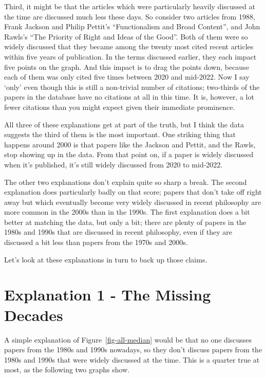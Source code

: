 \documentclass[
  10pt,
  letterpaper,
  DIV=11,
  numbers=noendperiod,
  twoside]{scrartcl}
\begin{document}
Third, it might be that the articles which were particularly heavily
discussed at the time are discussed much less these days. So consider
two articles from 1988, Frank Jackson and Philip Pettit's
``Functionalism and Broad Content'', and John Rawls's ``The Priority of
Right and Ideas of the Good''. Both of them were so widely discussed
that they became among the twenty most cited recent articles within five
years of publication. In the terms discussed earlier, they each impact
five points on the graph. And this impact is to drag the points down,
because each of them was only cited five times between 2020 and
mid-2022. Now I say `only' even though this is still a non-trivial
number of citations; two-thirds of the papers in the database have no
citations at all in this time. It is, however, a lot fewer citations
than you might expect given their immediate prominence.

All three of these explanations get at part of the truth, but I think
the data suggests the third of them is the most important. One striking
thing that happens around 2000 is that papers like the Jackson and
Pettit, and the Rawls, stop showing up in the data. From that point on,
if a paper is widely discussed when it's published, it's still widely
discussed from 2020 to mid-2022.

The other two explanations don't explain quite so sharp a break. The
second explanation does particularly badly on that score; papers that
don't take off right away but which eventually become very widely
discussed in recent philosophy are more common in the 2000s than in the
1990s. The first explanation does a bit better at matching the data, but
only a bit; there are plenty of papers in the 1980s and 1990s that are
discussed in recent philosophy, even if they are discussed a bit less
than papers from the 1970s and 2000s.

Let's look at these explanations in turn to back up those claims.

\section{Explanation 1 - The Missing Decades}\label{sec-missing-decades}

A simple explanation of Figure~\ref{fig-all-median} would be that no one
discusses papers from the 1980s and 1990s nowadays, so they don't
discuss papers from the 1980s and 1990s that were widely discussed at
the time. This is a quarter true at most, as the following two graphs
show.
\end{document}
